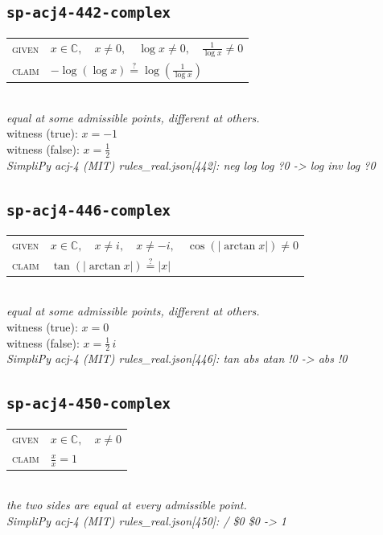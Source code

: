 \documentclass[11pt]{article}
\begin{document}
\subsection*{\texttt{sp-acj4-442-complex}}
\begin{tabular}{@{}l@{\quad}l@{}}
\textsc{given} & $x \in \mathbb{C},\quad x \neq 0,\quad \log x \neq 0,\quad \frac{1}{\log x} \neq 0$ \\[4pt]
\textsc{claim} & $\displaystyle -\log\left(\log x\right) \overset{?}{=} \log\left(\frac{1}{\log x}\right)$ \\
\end{tabular}\\[2pt]
{\small\emph{equal at some admissible points, different at others.}}\\
{\footnotesize\color{gray}witness (true): $x = -1$}\\
{\footnotesize\color{gray}witness (false): $x = \frac{1}{2}$}\\
\emph{SimpliPy acj-4 (MIT) rules\_real.json[442]: neg log log ?0  ->  log inv log ?0}\\

\subsection*{\texttt{sp-acj4-446-complex}}
\begin{tabular}{@{}l@{\quad}l@{}}
\textsc{given} & $x \in \mathbb{C},\quad x \neq i,\quad x \neq -i,\quad \cos\left(\left|\arctan x\right|\right) \neq 0$ \\[4pt]
\textsc{claim} & $\displaystyle \tan\left(\left|\arctan x\right|\right) \overset{?}{=} \left|x\right|$ \\
\end{tabular}\\[2pt]
{\small\emph{equal at some admissible points, different at others.}}\\
{\footnotesize\color{gray}witness (true): $x = 0$}\\
{\footnotesize\color{gray}witness (false): $x = \frac{1}{2} \, i$}\\
\emph{SimpliPy acj-4 (MIT) rules\_real.json[446]: tan abs atan !0  ->  abs !0}\\

\subsection*{\texttt{sp-acj4-450-complex}}
\begin{tabular}{@{}l@{\quad}l@{}}
\textsc{given} & $x \in \mathbb{C},\quad x \neq 0$ \\[4pt]
\textsc{claim} & $\displaystyle \frac{x}{x} = 1$ \\
\end{tabular}\\[2pt]
{\small\emph{the two sides are equal at every admissible point.}}\\
\emph{SimpliPy acj-4 (MIT) rules\_real.json[450]: / \$0 \$0  ->  1}\\
\end{document}

